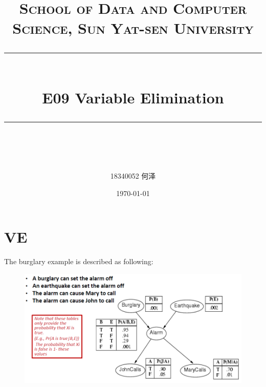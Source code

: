 \documentclass[a4paper, 11pt]{article}
\title{	
\normalfont \normalsize
\textsc{School of Data and Computer Science, Sun Yat-sen University} \\ [25pt] %
\rule{\textwidth}{0.5pt} \\[0.4cm] %
\huge  E09 Variable Elimination \\ %
\rule{\textwidth}{2pt} \\[0.5cm] %
\author{18340052  何泽}
\date{\normalsize\today}
}
\begin{document}
\maketitle
\tableofcontents
\newpage


\section{VE}

The burglary example is described as following:
\begin{figure}[h]
  \centering

  \includegraphics[width=14cm]{Pic/burglary}
\end{figure}
\end{document}

